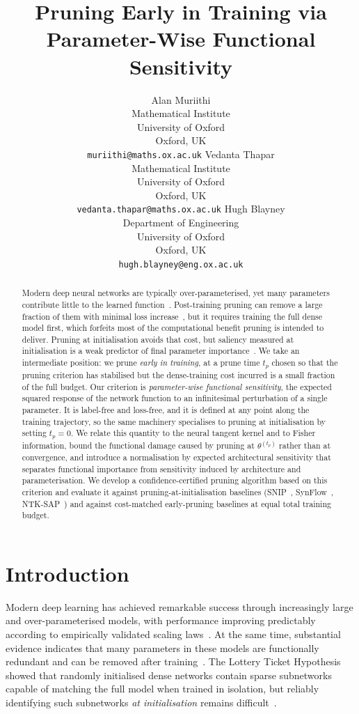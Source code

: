 \documentclass{article}
\title{Pruning Early in Training via Parameter-Wise Functional Sensitivity}
\author{
  Alan Muriithi \\
  Mathematical Institute \\
  University of Oxford \\
  Oxford, UK \\
  \texttt{muriithi@maths.ox.ac.uk}
  \And
  Vedanta Thapar \\
  Mathematical Institute \\
  University of Oxford \\
  Oxford, UK \\
  \texttt{vedanta.thapar@maths.ox.ac.uk}
  \And
  Hugh Blayney \\
  Department of Engineering\\
  University of Oxford \\
  Oxford, UK \\
  \texttt{hugh.blayney@eng.ox.ac.uk}
}
\theoremstyle{definition}
\theoremstyle{remark}
\begin{document}
\maketitle

\begin{abstract}
Modern deep neural networks are typically over-parameterised, yet many
parameters contribute little to the learned function~\cite{denil2013predicting,
blalock2020state}. Post-training pruning can remove a large fraction of them
with minimal loss increase~\cite{han2015learning}, but it requires training the
full dense model first, which forfeits most of the computational benefit
pruning is intended to deliver. Pruning at initialisation avoids that cost, but
saliency measured at initialisation is a weak predictor of final parameter
importance~\cite{frankle2021missing, su2020sanity}. We take an intermediate
position: we prune \emph{early in training}, at a prune time $t_p$ chosen so
that the pruning criterion has stabilised but the dense-training cost incurred
is a small fraction of the full budget. Our criterion is \emph{parameter-wise
functional sensitivity}, the expected squared response of the network function
to an infinitesimal perturbation of a single parameter. It is label-free and
loss-free, and it is defined at any point along the training trajectory, so the
same machinery specialises to pruning at initialisation by setting $t_p=0$. We
relate this quantity to the neural tangent kernel and to Fisher information,
bound the functional damage caused by pruning at $\theta^{(t_p)}$ rather than at
convergence, and introduce a normalisation by expected architectural sensitivity
that separates functional importance from sensitivity induced by architecture
and parameterisation. We develop a confidence-certified pruning algorithm based
on this criterion and evaluate it against pruning-at-initialisation baselines
(SNIP~\cite{lee2019snip}, SynFlow~\cite{tanaka2020synflow},
NTK-SAP~\cite{wang2023ntksap}) and against cost-matched early-pruning
baselines at equal total training budget.
\end{abstract}

\section{Introduction}

Modern deep learning has achieved remarkable success through increasingly large
and over-parameterised models, with performance improving predictably according
to empirically validated scaling laws~\cite{kaplan2020scaling,
hoffmann2022chinchilla}. At the same time, substantial evidence indicates that
many parameters in these models are functionally redundant and can be removed
after training~\cite{denil2013predicting, han2015learning, blalock2020state}.
The Lottery Ticket Hypothesis~\cite{frankle2019lottery} showed that randomly
initialised dense networks contain sparse subnetworks capable of matching the
full model when trained in isolation, but reliably identifying such subnetworks
\emph{at initialisation} remains difficult~\cite{frankle2021missing,
su2020sanity}.
\end{document}
